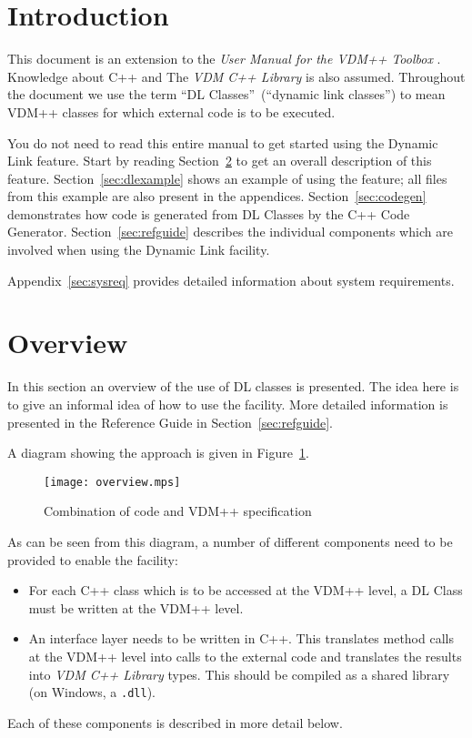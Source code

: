 \documentclass[\pformat,12pt]{article}
\newcommand{\vdmcpplib}{\textit{VDM C++ Library}}
\begin{document}


\section{Introduction}

This document is an extension to the {\it User Manual for the
 VDM++ Toolbox} \cite{UserManPP-SCSK}. Knowledge
about C++ \cite{Stroustrup91} and The {\vdmcpplib}
\cite{LibMan-SCSK} is also assumed. Throughout the document we use the term
``DL Classes''~(``dynamic link classes'') to mean VDM++ classes for
which external code is to be executed. 

You do not need to read this entire manual to get started using the
Dynamic Link feature. Start by reading Section~\ref{sec:overview}
to get an overall description of this
feature. Section~\ref{sec:dlexample} shows an example of using the
feature; all files from this example are also present in the
appendices. Section~\ref{sec:codegen} demonstrates how code is
generated from DL Classes by the C++ Code Generator.
Section~\ref{sec:refguide} describes the individual components which are
involved when using the Dynamic Link facility. 

Appendix~\ref{sec:sysreq} provides detailed information about system
requirements.




\section{Overview}\label{sec:overview}

In this section an overview of the use of DL classes is presented. The
idea here is to give an informal idea of how to use the facility. More
detailed information is presented in the Reference Guide in
Section~\ref{sec:refguide}. 

A diagram showing the approach is given in Figure~\ref{idea}. 
\begin{figure}
\begin{center}
\texttt{[image: overview.mps]}
\caption{Combination of code and VDM++ specification\label{idea}}
\end{center}
\end{figure}
As can be seen from this diagram, a number of different components
need to be provided to enable the facility:
\begin{itemize}
\item For each C++ class which is to be accessed at the VDM++ level, a
DL Class must be written at the VDM++ level.
\item An interface layer needs to be written in C++. This translates
method calls at the VDM++ level into calls to the external code and
translates the results into {\vdmcpplib} types. This should be compiled as a
shared library (on Windows, a \texttt{.dll}).
\end{itemize}
Each of these components is described in more detail below.
\end{document}
